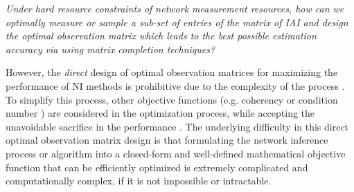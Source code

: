 \emph{Under hard resource constraints of network measurement resources, how can we optimally measure or sample a sub-set of entries of the matrix of IAI and design the optimal observation matrix which leads to the best possible estimation accuracy via using matrix completion techniques?}

However, the \emph{direct} design of optimal observation matrices for maximizing the performance of NI methods is prohibitive due to the complexity of the process \cite{IF14iSTAMP:2014}\cite{Elad:2007}. To simplify this process, other objective functions (e.g. coherency \cite{Elad:2007} or condition number \cite{MDFE:2013}) are considered in the optimization process, while accepting the unavoidable sacrifice in the performance \cite{Elad:2007}. The underlying difficulty in this direct optimal observation matrix design is that formulating the network inference process or algorithm into a closed-form and well-defined mathematical objective function that can be efficiently optimized is extremely complicated and computationally complex, if it is not impossible or intractable. 

